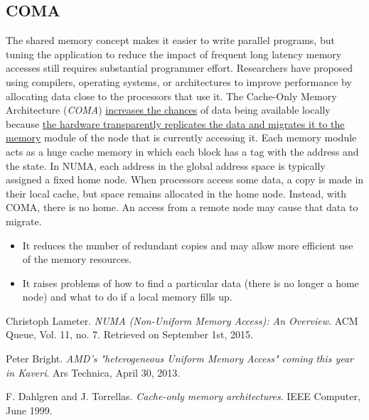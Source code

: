 \documentclass[12pt]{article}
\numberwithin{equation}{section}
\numberwithin{table}{section}
\numberwithin{figure}{section}
\begin{document}
\subsection*{COMA}
The shared memory concept makes it easier to write parallel programs, but tuning the application to reduce the impact of frequent long latency memory accesses still requires substantial programmer effort. Researchers have proposed using compilers, operating systems, or architectures to improve performance by allocating data close to the processors that use it. The Cache-Only Memory Architecture (\textit{COMA}) \underline{increases the chances} of data being available locally because \underline{the hardware transparently replicates the data and migrates it to the memory} module of the node that is currently accessing it. Each memory module acts as a huge cache memory in which each block has a tag with the address and the state.\cite{COMA}
In NUMA, each address in the global address space is typically assigned a fixed home node. When processors access some data, a copy is made in their local cache, but space remains allocated in the home node. Instead, with COMA, there is no home. An access from a remote node may cause that data to migrate.
\begin{itemize}
	\item It reduces the number of redundant copies and may allow more efficient use of the memory resources.
	
	\item It raises problems of how to find a particular data (there is no longer a home node) and what to do if a local memory fills up.
\end{itemize}
\begin{thebibliography}{9}
	Christoph Lameter. 
	\textit{NUMA (Non-Uniform Memory Access): An Overview}. ACM Queue, Vol. 11, no. 7. Retrieved on September 1st, 2015.
	
	Peter Bright. 
	\textit{AMD's "heterogeneous Uniform Memory Access" coming this year in Kaveri}. Ars Technica, April 30, 2013.
	
	F. Dahlgren and J. Torrellas. 
	\textit{Cache-only memory architectures}. IEEE Computer, June 1999.
\end{thebibliography}
\end{document}
